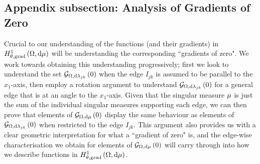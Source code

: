 
\subsection{Appendix subsection: Analysis of Gradients of Zero} \label{ssec:GradsOfZeroTheory}
Crucial to our understanding of the functions (and their gradients) in $H^1_{\theta, \mathrm{grad}}\left( \Omega, \mathrm{d}\mu \right)$ will be understanding the corresponding ``gradients of zero".
We work towards obtaining this understanding progressively; first we look to understand the set $\mathcal{G}_{ \Omega, \mathrm{d}\lambda_{jk}}\left( 0 \right)$ when the edge $I_{jk}$ is assumed to be parallel to the $x_1$-axis, then employ a rotation argument to understand $\mathcal{G}_{ \Omega, \mathrm{d}\lambda_{jk}}\left( 0 \right)$ for a general edge that is at an angle to the $x_1$-axis.
Given that the singular measure $\mu$ is just the sum of the individual singular measures supporting each edge, we can then prove that elements of $\mathcal{G}_{ \Omega, \mathrm{d}\mu}\left( 0 \right)$ display the same behaviour as elements of $\mathcal{G}_{ \Omega, \mathrm{d}\lambda_{jk}}\left( 0 \right)$ when restricted to the edge $I_{jk}$.
This argument also provides us with a clear geometric interpretation for what a ``gradient of zero" is, and the edge-wise characterisation we obtain for elements of $\mathcal{G}_{ \Omega, \mathrm{d}\mu}\left( 0 \right)$ will carry through into how we describe functions in $H^1_{\theta, \mathrm{grad}}\left( \Omega, \mathrm{d}\mu \right)$.


